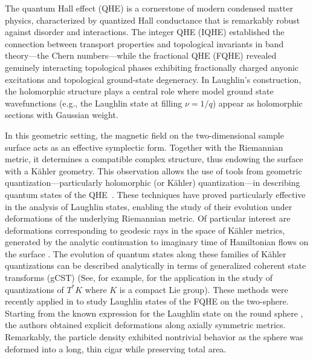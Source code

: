 \documentclass[a4paper,11pt]{article}
\begin{document}
The quantum Hall effect (QHE) is a cornerstone of modern condensed matter physics, characterized by quantized Hall conductance that is remarkably robust against disorder and interactions. The integer QHE (IQHE) established the connection between transport properties and topological invariants in band theory—the Chern numbers—while the fractional QHE (FQHE) revealed genuinely interacting topological phases exhibiting fractionally charged anyonic excitations and topological ground-state degeneracy. In Laughlin’s construction, the holomorphic structure plays a central role where model ground state wavefunctions (e.g., the Laughlin state at filling $\nu=1/q$) appear as holomorphic sections with Gaussian weight.

In this geometric setting, the magnetic field on the two-dimensional sample surface acts as an effective symplectic form. Together with the Riemannian metric, it determines a compatible complex structure, thus endowing the surface with a Kähler geometry. This observation allows the use of tools from geometric quantization—particularly holomorphic (or Kähler) quantization—in describing quantum states of the QHE~\cite{Woodhouse}. These techniques have proved particularly effective in the analysis of Laughlin states, enabling the study of their evolution under deformations of the underlying Riemannian metric. Of particular interest are deformations corresponding to geodesic rays in the space of Kähler metrics, generated by the analytic continuation to imaginary time of Hamiltonian flows on the surface \cite{donaldson:1999,MouraoPimentelComplextime}. The evolution of quantum states along these families of Kähler quantizations can be described analytically in terms of generalized coherent state transforms (gCST) (See, for example, \cite{MouraoPimentelGCST} for the application in the study of quantizations of $T^*K$ where $K$ is a compact Lie group). These methods were recently applied in \cite{matos:mera:mourao:mourao:nunes:2023} to study Laughlin states of the FQHE on the two-sphere. Starting from the known expression for the Laughlin state on the round sphere \cite{Haldane2}, the authors obtained explicit deformations along axially symmetric metrics. Remarkably, the particle density exhibited nontrivial behavior as the sphere was deformed into a long, thin cigar while preserving total area.
\end{document}
